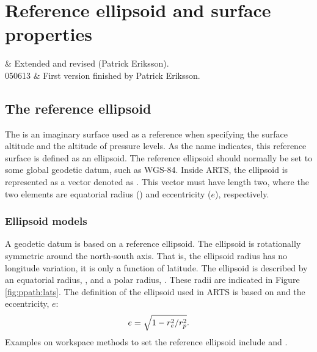 \chapter{Reference ellipsoid and surface properties}
 \label{sec:surface}


 & Extended and revised (Patrick Eriksson). \\
  050613 & First version finished by Patrick Eriksson. \\
\stophistory


\graphicspath{{Figs/ppath/}{Figs/rte/}}


\section{The reference ellipsoid}
\label{sec:fm_defs:geoid}

The  is an imaginary surface used as a reference when
specifying the surface altitude and the altitude of pressure levels. As the
name indicates, this reference surface is defined as an ellipsoid. The
reference ellipsoid should normally be set to some global geodetic datum, such
as WGS-84.
Inside ARTS, the ellipsoid is represented as a vector denoted as
. This vector must have length two, where the two
elements are equatorial radius () and eccentricity ($e$), respectively.




\subsection{Ellipsoid models}
\label{sec:ppath:geoid}

A geodetic datum is based on a reference ellipsoid. The ellipsoid is
rotationally symmetric around the north-south axis. That is, the ellipsoid
radius has no longitude variation, it is only a function of latitude. The
ellipsoid is described by an equatorial radius, , and a polar radius,
. These radii are indicated in Figure \ref{fig:ppath:lats}. The
definition of the ellipsoid used in ARTS is based on  and the
eccentricity, $e$:
\begin{equation}
 e = \sqrt{1-r_{e}^2/r_{p}^2}.
 \label{eq:ppath:eccentricity} 
\end{equation}
Examples on workspace methods to set the reference ellipsoid include 
 and .


